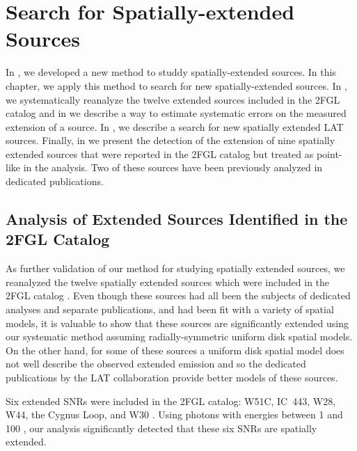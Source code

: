 \chapter{Search for Spatially-extended  Sources}


In , we developed a new method to studdy
spatially-extended sources.  In this chapter, we apply this method to
search for new spatially-extended sources.  In ,
we systematically reanalyze the twelve extended sources included in the
2FGL catalog and in  we describe a
way to estimate systematic errors on the measured extension of a source.
In , we describe a search for new
spatially extended LAT sources. Finally, in 
we present the detection of the extension of nine spatially extended
sources that were reported in the 2FGL catalog but treated as point-like
in the analysis.  Two of these sources have been previously analyzed in
dedicated publications.

\section{Analysis of Extended Sources Identified in the 2FGL Catalog}

As further validation of our method for studying spatially extended
sources, we reanalyzed the twelve spatially extended sources which were
included in the 2FGL catalog \citep{nolan_2012_fermi-large}.  Even though
these sources had all been the subjects of dedicated analyses and separate
publications, and had been fit with a variety of spatial models, it is
valuable to show that these sources are significantly extended using our
systematic method assuming radially-symmetric uniform disk spatial models.
On the other hand, for some of these sources a uniform disk spatial
model does not well describe the observed extended emission and so the
dedicated publications by the LAT collaboration provide better models
of these sources.

Six extended SNRs were included in the
2FGL catalog: W51C, IC~443, W28, W44, the Cygnus Loop, and W30
\citep{abdo_2009a_fermi-discovery,abdo_2010a_observation-supernova,abdo_2010d_fermi-large,abdo_2010a_gamma-ray-emission,katagiri_2011a_fermi-large,ajello_2012a_fermi-large}.
Using photons with energies between 1 \gev and 100 \gev, our analysis
significantly detected that these six SNRs are spatially extended.

